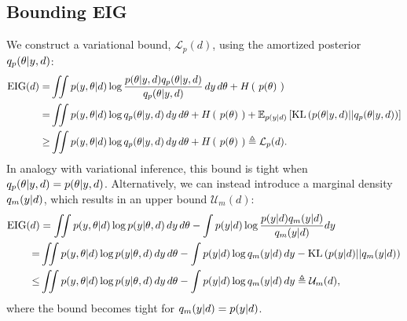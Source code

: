 \subsection{Bounding EIG}
\label{sec:bounds}
We construct a variational bound, $\mathcal{L}_p(d)$, using the amortized posterior $q_p(\theta | y,d)$:
\begin{align}
	\text{EIG}(d) =& \iint  p(y, \theta | d) \log \frac{p(\theta | y, d)q_{{p}}(\theta | y,d)}{q_p(\theta | y,d)} \, dy \, d\theta + H\left(\ p(\theta)\ \right)  \\
	=& \iint p(y, \theta | d) \log q_p(\theta | y, d)  \, dy\, d\theta+H\left(\ p(\theta)\ \right) + \mathbb{E}_{p(y|d)} \left[\text{KL}\left(p(\theta | y,d)||q_p(\theta | y, d)\right)\right]\\
	\label{eq:postbound}
	\ge& \iint p(y, \theta | d) \log q_p(\theta | y, d) \, dy\, d\theta+H\left(\ p(\theta)\ \right) \triangleq \mathcal{L}_p(d).
\end{align}
In analogy with variational inference, this bound is tight when $q_p(\theta | y, d) = p(\theta | y, d)$.
%
Alternatively, we can instead introduce a marginal density $q_m(y|d)$, which results in an upper bound $\mathcal{U}_m(d)$:
\begin{align}
	\text{EIG}(d)&= \iint p(y, \theta | d) \log p(y | \theta, d) \, dy\, d\theta-\int p(y|d) \log \frac{p(y|d)q_m(y|d)}{q_m(y|d)} dy
	\\
	=& \iint p(y, \theta | d) \log p(y | \theta, d) \, dy\, d\theta-\int p(y|d) \log q_m(y|d) \, dy
	-\text{KL}\left(p(y|d)||q_m(y|d)\right)\\
	\label{eq:margbound}
	\le& \iint p(y, \theta | d) \log p(y | \theta, d) \, dy\, d\theta-\int p(y|d) \log q_m(y|d) \, dy
	\triangleq \mathcal{U}_m(d),
\end{align}
where the bound becomes tight for $q_m(y|d)=p(y|d)$.

